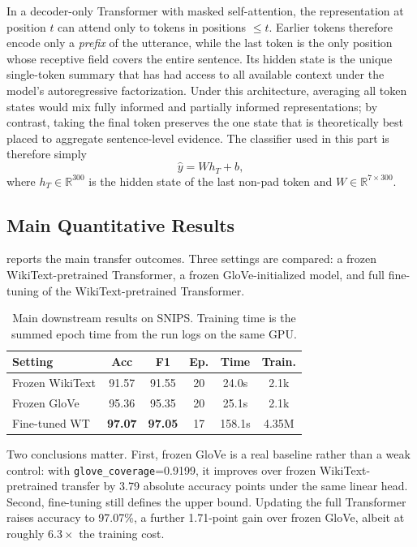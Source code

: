 \documentclass[10pt,a4paper]{article}
\begin{document}
In a decoder-only Transformer with masked self-attention, the representation at position $t$ can attend only to tokens in positions $\leq t$. Earlier tokens therefore encode only a \emph{prefix} of the utterance, while the last token is the only position whose receptive field covers the entire sentence. Its hidden state is the unique single-token summary that has had access to all available context under the model's autoregressive factorization. Under this architecture, averaging all token states would mix fully informed and partially informed representations; by contrast, taking the final token preserves the one state that is theoretically best placed to aggregate sentence-level evidence. The classifier used in this part is therefore simply
\[
\hat{y} = W h_T + b,
\]
where $h_T \in \mathbb{R}^{300}$ is the hidden state of the last non-pad token and $W \in \mathbb{R}^{7 \times 300}$.

\subsection{Main Quantitative Results}
\label{sec:part3_results}

 reports the main transfer outcomes. Three settings are compared: a frozen WikiText-pretrained Transformer, a frozen GloVe-initialized model, and full fine-tuning of the WikiText-pretrained Transformer.

\begin{table}[htbp]
\centering
\caption{Main downstream results on SNIPS. Training time is the summed epoch time from the run logs on the same GPU.}
\label{tab:transfer_results}
\small
\renewcommand{\arraystretch}{1.05}
\begin{tabular}{@{}lccccc@{}}
\toprule
\textbf{Setting} & \textbf{Acc} & \textbf{F1} & \textbf{Ep.} & \textbf{Time} & \textbf{Train.} \\
\midrule
Frozen WikiText & 91.57 & 91.55 & 20 & 24.0s & 2.1k \\
Frozen GloVe    & 95.36 & 95.35 & 20 & 25.1s & 2.1k \\
Fine-tuned WT   & \textbf{97.07} & \textbf{97.05} & 17 & 158.1s & 4.35M \\
\bottomrule
\end{tabular}
\end{table}

Two conclusions matter. First, frozen GloVe is a real baseline rather than a weak control: with \texttt{glove\_coverage}=0.9199, it improves over frozen WikiText-pretrained transfer by 3.79 absolute accuracy points under the same linear head. Second, fine-tuning still defines the upper bound. Updating the full Transformer raises accuracy to 97.07\%, a further 1.71-point gain over frozen GloVe, albeit at roughly $6.3\times$ the training cost.
\end{document}
